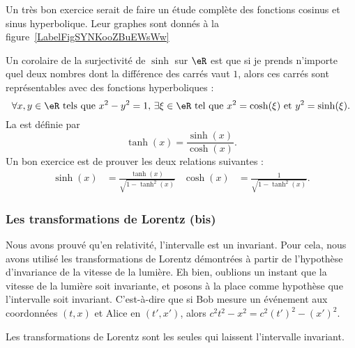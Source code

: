 \newcommand{\CaptionFigSYNKooZBuEWsWw}{En rouge, la fonction $x\mapsto \sinh(x)$ et en bleu, la fonction $x\mapsto\cosh(x)$.}


Un très bon exercice serait de faire un étude complète des fonctions cosinus et sinus hyperbolique. Leur graphes sont donnés à la figure~\ref{LabelFigSYNKooZBuEWsWw}

Un corolaire de la surjectivité de $\sinh$ sur $\eR$ est que si je prends n'importe quel deux nombres dont la différence des carrés vaut $1$, alors ces carrés sont représentables avec des fonctions hyperboliques :
\[
  \forall x,y\in\eR \text{ tels que } x^2-y^2=1,\,\exists\xi\in\eR \text{ tel que } x^2=\cosh(\xi)\text{ et }y^2=\sinh(\xi).
\]
La  est définie par
\begin{equation}
\tanh(x)=\frac{ \sinh(x) }{ \cosh(x) }.
\end{equation}
Un bon exercice est de prouver les deux relations suivantes :
\begin{align}		\label{EqRelSinhthcosh}
	\sinh(x)&=\frac{ \tanh(x) }{ \sqrt{1-\tanh^2(x)} }	&\cosh(x)&=\frac{1}{ \sqrt{1-\tanh^2(x)} }.
\end{align}

\subsubsection{Les transformations de Lorentz (bis)}

Nous avons prouvé qu'en relativité, l'intervalle est un invariant. Pour cela, nous avons utilisé les transformations de Lorentz démontrées à partir de l'hypothèse d'invariance de la vitesse de la lumière. Eh bien, oublions un instant que la vitesse de la lumière soit invariante, et posons à la place comme hypothèse que l'intervalle soit invariant. C'est-à-dire que si Bob mesure un événement aux coordonnées $(t,x)$ et Alice en $(t',x')$, alors $c^2t^2-x^2=c^2(t')^2-(x')^2$.

\begin{theorem}
Les transformations de Lorentz sont les seules qui laissent l'intervalle invariant.
\end{theorem}

